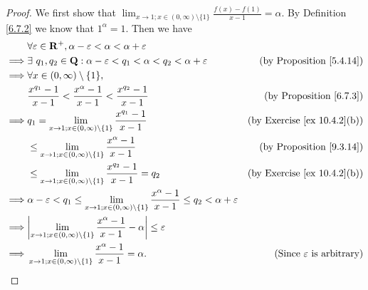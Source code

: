 \begin{proof}
    We first show that \(\lim_{x \to 1 ; x \in (0, \infty) \setminus \{1\}} \frac{f(x) - f(1)}{x - 1} = \alpha\).
    By Definition \ref{6.7.2} we know that \(1^{\alpha} = 1\).
    Then we have
    \begin{align*}
                 & \forall \varepsilon \in \mathbf{R}^+, \alpha - \varepsilon < \alpha < \alpha + \varepsilon                                                                                                    \\
        \implies & \exists\ q_1, q_2 \in \mathbf{Q} : \alpha - \varepsilon < q_1 < \alpha < q_2 < \alpha + \varepsilon                                             & \text{(by Proposition \ref{5.4.14})}        \\
        \implies & \forall x \in (0, \infty) \setminus \{1\},                                                                                                                                                    \\
                 & \frac{x^{q_1} - 1}{x - 1} < \frac{x^{\alpha} - 1}{x - 1} < \frac{x^{q_2} - 1}{x - 1}                                                            & \text{(by Proposition \ref{6.7.3})}         \\
        \implies & q_1 = \lim_{x \to 1 ; x \in (0, \infty) \setminus \{1\}} \frac{x^{q_1} - 1}{x - 1}                                                              & \text{(by Exercise \ref{ex 10.4.2}(b))}     \\
                 & \leq \lim_{x \to 1 ; x \in (0, \infty) \setminus \{1\}} \frac{x^{\alpha} - 1}{x - 1}                                                            & \text{(by Proposition \ref{9.3.14})}        \\
                 & \leq \lim_{x \to 1 ; x \in (0, \infty) \setminus \{1\}} \frac{x^{q_2} - 1}{x - 1} = q_2                                                         & \text{(by Exercise \ref{ex 10.4.2}(b))}     \\
        \implies & \alpha - \varepsilon < q_1 \leq \lim_{x \to 1 ; x \in (0, \infty) \setminus \{1\}} \frac{x^{\alpha} - 1}{x - 1} \leq q_2 < \alpha + \varepsilon                                               \\
        \implies & \abs*{\lim_{x \to 1 ; x \in (0, \infty) \setminus \{1\}} \frac{x^{\alpha} - 1}{x - 1} - \alpha} \leq \varepsilon                                                                              \\
        \implies & \lim_{x \to 1 ; x \in (0, \infty) \setminus \{1\}} \frac{x^{\alpha} - 1}{x - 1} = \alpha.                                                       & \text{(Since \(\varepsilon\) is arbitrary)}
    \end{align*}


\end{proof}
